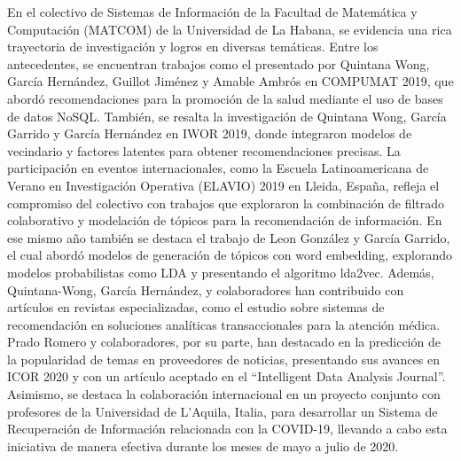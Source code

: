 En el colectivo de Sistemas de Información de la Facultad de Matemática y Computación (MATCOM) de la Universidad de La Habana, se evidencia una rica trayectoria de investigación y logros en diversas temáticas.  Entre los antecedentes, se encuentran trabajos como el presentado por Quintana Wong, García Hernández, Guillot Jiménez y Amable Ambrós en COMPUMAT 2019, que abordó recomendaciones para la promoción de la salud mediante el uso de bases de datos NoSQL. También, se resalta la investigación de Quintana Wong, Garc\'ia Garrido y García Hernández en IWOR 2019, donde integraron modelos de vecindario y factores latentes para obtener recomendaciones precisas. La participación en eventos internacionales, como la Escuela Latinoamericana de Verano en Investigación Operativa (ELAVIO) 2019 en Lleida, España, refleja el compromiso del colectivo con trabajos que exploraron la combinación de filtrado colaborativo y modelación de tópicos para la recomendación de información. En ese mismo a\~no también se destaca el trabajo de Leon González y Garc\'ia Garrido, el cual abordó modelos de generación de tópicos con word embedding, explorando modelos probabilistas como LDA y presentando el algoritmo lda2vec. Además, Quintana-Wong, García Hernández, y colaboradores han contribuido con artículos en revistas especializadas, como el estudio sobre sistemas de recomendación en soluciones analíticas transaccionales para la atención médica. Prado Romero y colaboradores, por su parte, han destacado en la predicción de la popularidad de temas en proveedores de noticias, presentando sus avances en ICOR 2020 y con un artículo aceptado en el ``Intelligent Data Analysis Journal''. Asimismo, se destaca la colaboración internacional en un proyecto conjunto con profesores de la Universidad de L'Aquila, Italia, para desarrollar un Sistema de Recuperación de Información relacionada con la COVID-19, llevando a cabo esta iniciativa de manera efectiva durante los meses de mayo a julio de 2020. %

